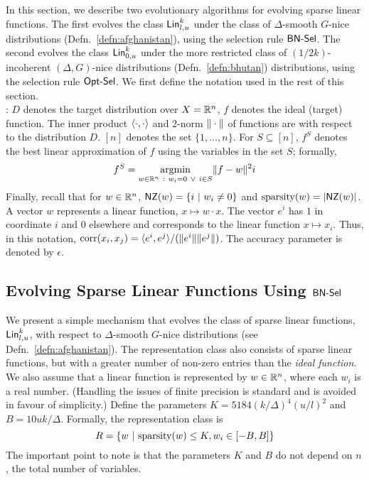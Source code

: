 In this section, we describe two evolutionary algorithms for evolving sparse
linear functions. The first evolves the class $\mathsf{Lin}^k_{l, u}$ under the class of
$\Delta$-smooth $G$-nice distributions (Defn.~\ref{defn:afghanistan}), using the
selection rule $\mathsf{BN\mbox{-}Sel}$. The second evolves the class $\mathsf{Lin}^k_{0, u}$ under the
more restricted class of $(1/2k)$-incoherent $(\Delta, G)$-nice distributions
(Defn.~\ref{defn:bhutan}) distributions, using the selection rule $\mathsf{Opt\mbox{-}Sel}$. We
first define the notation used in the rest of this section.\smallskip \\

: $D$ denotes the target distribution over $X =
\mathbb{R}^n$, $f$ denotes the ideal (target) function. The inner product
$\langle \cdot, \cdot \rangle$ and $2$-norm $\Vert \cdot \Vert$ of functions are with
respect to the distribution $D$. $[n]$ denotes the set $\{1, \ldots, n\}$. For
$S \subseteq [n]$, $f^S$ denotes the best linear approximation of $f$ using the
variables in the set $S$; formally,
\begin{align}
f^S = \underset{w \in \reals^n~:~ w_i = 0 ~\vee~i \in S}\argmin \ltwonorm{f -
w}^2 \nonumber i%
\end{align}
Finally, recall that for $w \in \mathbb{R}^n$, $\mathsf{NZ}(w) = \{i ~|~ w_i \neq 0 \}$ and
$\mathrm{sparsity}(w) = |\mathsf{NZ}(w)|$. A vector $w$ represents a linear function, $x \mapsto
w \cdot x$. The vector $e^i$ has $1$ in coordinate $i$ and $0$ elsewhere and
corresponds to the linear function $x \mapsto x_i$. Thus, in this notation,
$\mathrm{corr}(x_i, x_j) = \langle e^i, e^j \rangle/(\Vert e^i \Vert\Vert e^j \Vert)$. The accuracy
parameter is denoted by $\epsilon$. 

\subsection{Evolving Sparse Linear Functions Using $\mathsf{BN\mbox{-}Sel}$}
\label{sec:sparse_linear}

We present a simple mechanism that evolves the class of sparse linear functions,
$\mathsf{Lin}^k_{l, u}$, with respect to $\Delta$-smooth $G$-nice distributions (see
Defn.~\ref{defn:afghanistan}). The representation class also consists of
sparse linear functions, but with a greater number of non-zero entries than the
\emph{ideal function}. We also assume that a linear function is represented by
$w \in \mathbb{R}^n$, where each $w_i$ is a real number. (Handling the issues of
finite precision is standard and is avoided in favour of simplicity.) Define the
parameters $K = 5184(k/\Delta)^4(u/l)^2$ and $B = 10 uk /\Delta$. Formally, the
representation class is
\[ 
R = \{ w ~|~ \mathrm{sparsity}(w) \leq K, w_i \in [-B, B] \}
\]
The important point to note is that the parameters $K$ and $B$ do not depend on
$n$, the total number of variables.

